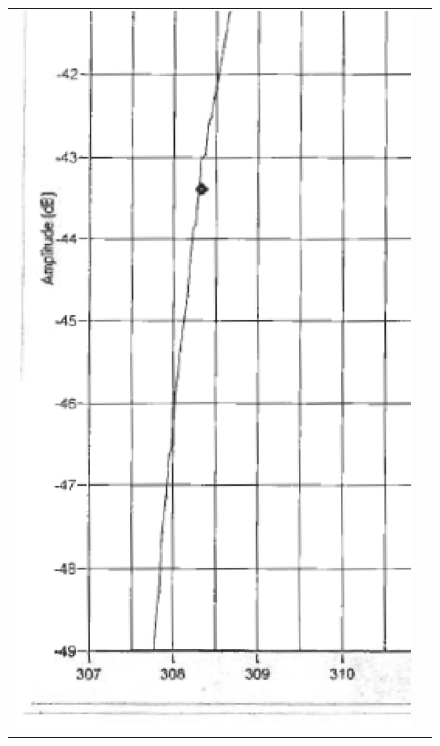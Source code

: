 \begin{figure}[H]
\begin{tabular}{c c}
    \includegraphics[bb=249 194 1431 1035,scale=0.2]{graphics/log_book/ch14_lowf.eps} & 

\end{tabular}
\end{figure}
